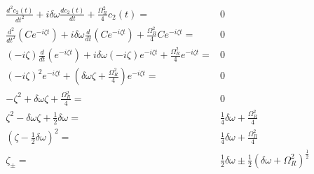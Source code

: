 \documentclass[twoside]{article}
\begin{document}
\begin{equation}
    \begin{split}
        \frac{d^2 c_2(t)}{d t^2} + i\delta\omega \frac{d c_2 (t)}{dt} + \frac{\Omega_R^2}{4} c_2(t) =                                                            & 0                                                                                          \\
        \frac{d^2}{d t^2} \left(C e^{-i\zeta t}\right) + i\delta\omega \frac{d}{dt} \left(C e^{-i\zeta t}\right) + \frac{\Omega_R^2}{4} C e^{-i\zeta t} =        & 0                                                                                          \\
        \left(-i\zeta \right) \frac{d}{d t} \left(e^{-i\zeta t}\right) + i\delta\omega \left(-i\zeta \right) e^{-i\zeta t}+ \frac{\Omega_R^2}{4} e^{-i\zeta t} = & 0                                                                                          \\
        \left(-i\zeta \right)^2 e^{-i\zeta t} + \left(\delta\omega\zeta + \frac{\Omega_R^2}{4}\right) e^{-i\zeta t} =                                            & 0                                                                                          \\
        -\zeta^2 + \delta\omega\zeta + \frac{\Omega_R^2}{4} =                                                                                                    & 0                                                                                          \\
        \zeta^2 - \delta\omega\zeta + \frac{1}{2} \delta\omega  =                                                                                                & \frac{1}{4}\delta\omega + \frac{\Omega_R^2}{4}                                             \\
        \left(\zeta  - \frac{1}{2}\delta\omega\right)^2  =                                                                                                       & \frac{1}{4}\delta\omega + \frac{\Omega_R^2}{4}                                             \\
        \zeta_\pm  =                                                                                                                                             & \frac{1}{2}\delta\omega \pm \frac{1}{2} \left(\delta\omega + \Omega_R^2\right)^\frac{1}{2} \\
    \end{split}
\end{equation}
\end{document}
